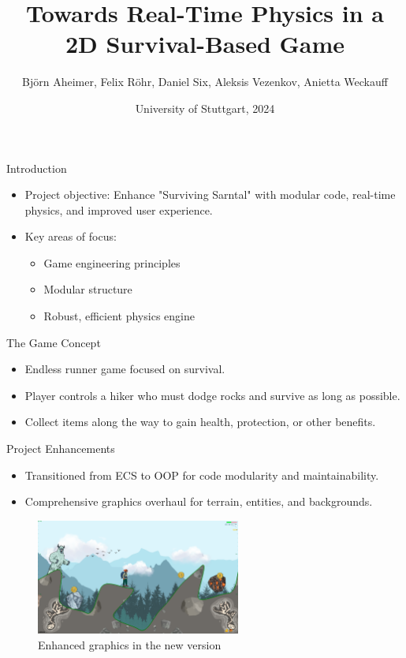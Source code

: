 \documentclass{beamer}
\title{Towards Real-Time Physics in a 2D Survival-Based Game}
\author{Björn Aheimer, Felix Röhr, Daniel Six, Aleksis Vezenkov, Anietta Weckauff}
\date{University of Stuttgart, 2024}
\begin{document}
\begin{frame}
    \titlepage
\end{frame}

\begin{frame}{Introduction}
    \begin{itemize}
        \item Project objective: Enhance "Surviving Sarntal" with modular code, real-time physics, and improved user experience.
        \item Key areas of focus:
        \begin{itemize}
            \item Game engineering principles
            \item Modular structure
            \item Robust, efficient physics engine
        \end{itemize}
    \end{itemize}
\end{frame}

\begin{frame}{The Game Concept}
    \begin{itemize}
        \item Endless runner game focused on survival.
        \item Player controls a hiker who must dodge rocks and survive as long as possible.
        \item Collect items along the way to gain health, protection, or other benefits.
    \end{itemize}
\end{frame}

\begin{frame}{Project Enhancements}
    \begin{itemize}
        \item Transitioned from ECS to OOP for code modularity and maintainability.
        \item Comprehensive graphics overhaul for terrain, entities, and backgrounds.
    \end{itemize}
    \begin{figure}
        \centering
        \includegraphics[width=0.6\textwidth]{../figures/new_game.png} %
        \caption{Enhanced graphics in the new version}
    \end{figure}
\end{frame}
\end{document}
